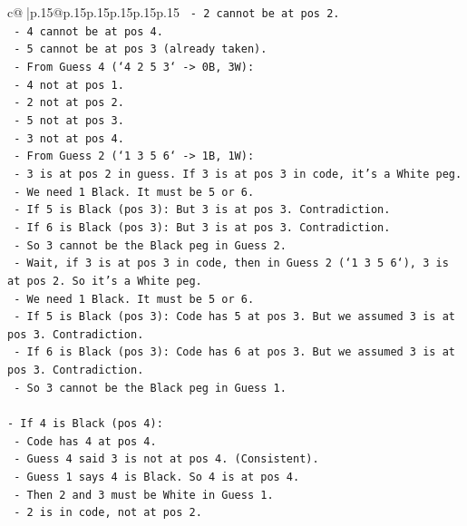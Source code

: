 \documentclass{article}
\begin{document}
{\begin{supertabular}{c@{$\;$}|p{.15\linewidth}@{}p{.15\linewidth}p{.15\linewidth}p{.15\linewidth}p{.15\linewidth}p{.15\linewidth}}
{{{\texttt{    {-}   2 cannot be at pos 2.} \\
\texttt{    {-}   4 cannot be at pos 4.} \\
\texttt{    {-}   5 cannot be at pos 3 (already taken).} \\
\texttt{    {-}   From Guess 4 (`4 2 5 3` {-}> 0B, 3W):} \\
\texttt{        {-}   4 not at pos 1.} \\
\texttt{        {-}   2 not at pos 2.} \\
\texttt{        {-}   5 not at pos 3.} \\
\texttt{        {-}   3 not at pos 4.} \\
\texttt{    {-}   From Guess 2 (`1 3 5 6` {-}> 1B, 1W):} \\
\texttt{        {-}   3 is at pos 2 in guess. If 3 is at pos 3 in code, it's a White peg.} \\
\texttt{        {-}   We need 1 Black. It must be 5 or 6.} \\
\texttt{        {-}   If 5 is Black (pos 3): But 3 is at pos 3. Contradiction.} \\
\texttt{        {-}   If 6 is Black (pos 3): But 3 is at pos 3. Contradiction.} \\
\texttt{        {-}   So 3 cannot be the Black peg in Guess 2.} \\
\texttt{        {-}   Wait, if 3 is at pos 3 in code, then in Guess 2 (`1 3 5 6`), 3 is at pos 2. So it's a White peg.} \\
\texttt{        {-}   We need 1 Black. It must be 5 or 6.} \\
\texttt{        {-}   If 5 is Black (pos 3): Code has 5 at pos 3. But we assumed 3 is at pos 3. Contradiction.} \\
\texttt{        {-}   If 6 is Black (pos 3): Code has 6 at pos 3. But we assumed 3 is at pos 3. Contradiction.} \\
\texttt{    {-}   So 3 cannot be the Black peg in Guess 1.} \\
\\ 
\texttt{{-}   If 4 is Black (pos 4):} \\
\texttt{    {-}   Code has 4 at pos 4.} \\
\texttt{    {-}   Guess 4 said 3 is not at pos 4. (Consistent).} \\
\texttt{    {-}   Guess 1 says 4 is Black. So 4 is at pos 4.} \\
\texttt{    {-}   Then 2 and 3 must be White in Guess 1.} \\
\texttt{        {-}   2 is in code, not at pos 2.} \\
}}}
\end{supertabular}}
\end{document}
